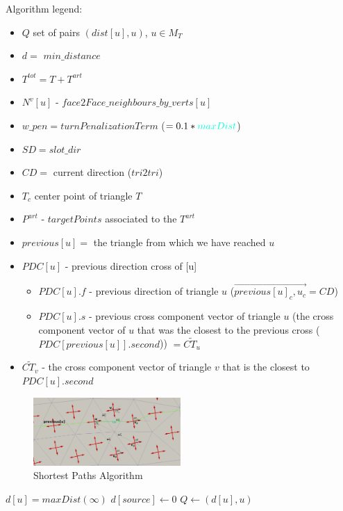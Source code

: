 \documentclass[a4paper]{report}
\begin{document}
{{		Algorithm legend:
		\begin{itemize}
		\item $Q$ set of pairs $(dist[u], u)$, $ u \in M_T$
		\item $d = $ \textcolor{myGreen}{$min\_distance$}
		\item $T^{tot} = T + T^{art}$
		\item $N^{v}[u]$ - \textcolor{myGreen}{$face2Face\_neighbours\_by\_verts$}$[u]$
		\item $w\_{pen} = $\textcolor{myGreen}{$turnPenalizationTerm$} ($ = 0.1 * \textcolor{myGreen}{maxDist}$)
		\item $SD = slot\_dir$
		\item $CD = $ current direction (\textcolor{myGreen}{$tri2tri$})
		\item $T_c$ center point of triangle $T$
		\item $P^{art}$ - \textcolor{myGreen}{$targetPoints$} associated to the $T^{art}$
		\item $previous[u] = $ the triangle from which we have reached $u$ 
		\item $PDC[u]$ - previous direction cross of [u]
		\begin{itemize}
		\item $PDC[u].f$ - previous direction of triangle $u$ ($\overrightarrow{previous[u]_c, u_c} = CD$)
		\item $PDC[u].s$ - previous cross component vector of triangle $u$ (the cross component vector of $u$ that was the closest to the previous cross ($PDC[previous[u]].second$)) $ =  \widetilde{CT_u}$
		\end{itemize}
		 
		\item $\widetilde{CT_v}$ - the cross component vector of triangle $v$ that is the closest to  $PDC[u].second$
		\end{itemize}
		\begin{figure}[h]
\includegraphics[width=0.5\textwidth]{shortestPaths-zoom2}
\caption{Shortest Paths Algorithm}
\end{figure}
\newpage
		\begin{algorithmic}[2]
		\State $d[u] = maxDist (\infty)$
		\EndFor
		\State $d[source]\gets 0$
		\State $Q \leftarrow (d[u], u)$
		\EndFor
		 

\end{algorithmic}}}
\end{document}
